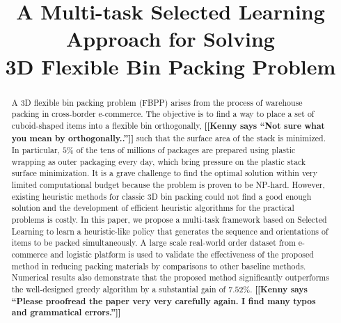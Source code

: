 \documentclass[letterpaper]{article} %
\newcommand{\KZ}[1]{{\bf \color{red} [[Kenny says ``#1'']]}}
\begin{document}
%
\title{A Multi-task Selected Learning Approach for Solving \\ 3D Flexible Bin Packing Problem}

\maketitle
\begin{abstract}
	A 3D flexible bin packing problem (FBPP) arises from the process of warehouse packing in cross-border e-commerce. The objective is to find a way to 
place a set of cuboid-shaped items into a flexible bin orthogonally,\KZ{Not sure
what you mean by orthogonally..} 
such that the surface area of the stack is minimized. In particular, $5\%$ of the tens of millions of packages are prepared using plastic wrapping as outer packaging every day, which bring pressure on the plastic stack surface minimization. 
It is a grave challenge to find the optimal solution within very limited 
computational budget because the problem is proven to be NP-hard. However, existing heuristic methods for classic 3D bin packing could not find a good enough solution and the development of efficient heuristic algorithms for the practical problems is costly. %
In this paper, we propose a multi-task 
framework based on Selected Learning to learn a heuristic-like policy that generates the sequence and orientations of items to be packed simultaneously. A large scale real-world order dataset from e-commerce and logistic platform is used to validate the effectiveness of the proposed method in reducing packing materials by comparisons to other baseline methods. Numerical results also demonstrate that the proposed method significantly outperforms the well-designed greedy algorithm by 
a substantial gain of $7.52\%$. 
\KZ{Please proofread the paper very very carefully again. I find many typos
and grammatical errors.}
\end{abstract}
\end{document}
